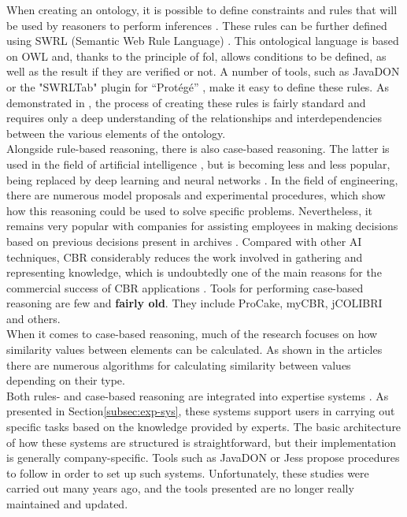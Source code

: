             When creating an ontology, it is possible to define constraints and rules that will be used by reasoners to perform inferences \cite{noy2001ontology}. These rules can be further defined using SWRL (Semantic Web Rule Language) \cite{liu2010ontology, abadi2018improving}. This ontological language is based on OWL and, thanks to the principle of \acrfull{fol}, allows conditions to be defined, as well as the result if they are verified or not. A number of tools, such as JavaDON \cite{jovanovic2005achieving} or the "SWRLTab" plugin for “Protégé” \cite{liu2010ontology}, make it easy to define these rules. As demonstrated in \cite{li2018ontology, jeon2016automatic, na2016development}, the process of creating these rules is fairly standard and requires only a deep understanding of the relationships and interdependencies between the various elements of the ontology.\\

            Alongside rule-based reasoning, there is also case-based reasoning. The latter is used in the field of artificial intelligence \cite{wilke1995fallbasiertes, althoff1992fallbasiertes}, but is becoming less and less popular, being replaced by deep learning and neural networks \cite{wiratunga2011case}. In the field of engineering, there are numerous model proposals and experimental procedures, which show how this reasoning could be used to solve specific problems. Nevertheless, it remains very popular with companies for assisting employees in making decisions based on previous decisions present in archives \cite{eshach2003case}. Compared with other AI techniques, CBR considerably reduces the work involved in gathering and representing knowledge, which is undoubtedly one of the main reasons for the commercial success of CBR applications \cite{benjamin2006using, wiratunga2011case}. Tools for performing case-based reasoning are few and \textbf{fairly old}. They include ProCake, myCBR, jCOLIBRI and others.\\

            When it comes to case-based reasoning, much of the research focuses on how similarity values between elements can be calculated. As shown in the articles \cite{shaheen2020novel, chen2012recommendation, wang2020similarity, malburg2021improving, racharak2021approximation, adel2022interval} there are numerous algorithms for calculating similarity between values depending on their type.\\

            Both rules- and case-based reasoning are integrated into expertise systems \cite{lin2021multivariable}. As presented in Section\ref{subsec:exp-sys}, these systems support users in carrying out specific tasks based on the knowledge provided by experts. The basic architecture of how these systems are structured is straightforward, but their implementation is generally company-specific. Tools such as JavaDON or Jess propose procedures to follow in order to set up such systems. Unfortunately, these studies were carried out many years ago, and the tools presented are no longer really maintained and updated.\\

